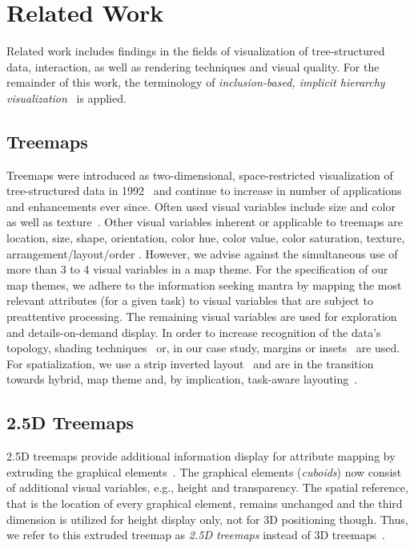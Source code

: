 \documentclass[sigconf]{acmart}
\begin{document}
\section{Related Work}
\label{sec:related}
\noindent Related work includes findings in the fields of visualization of tree-structured data, interaction, as well as rendering techniques and visual quality. 
For the remainder of this work, the terminology of \emph{inclusion-based, implicit hierarchy visualization}~\cite{Schulz2011,Dubel2014} is applied.

\subsection{Treemaps} 
Treemaps were introduced as two-dimensional, space-restricted visualization of tree-structured data in 1992~\cite{Shneiderman1992} and continue to increase in number of applications and enhancements ever since. 
Often used visual variables include size and color~\cite{Fekete2002} as well as texture~\cite{Holten2005}.
Other visual variables inherent or applicable to treemaps are location, size, shape, orientation, color hue, color value, color saturation, texture, arrangement/layout/order \cite{Roth2016}.
However, we advise against the simultaneous use of more than 3 to 4 visual variables in a map theme.
For the specification of our map themes, we adhere to the information seeking mantra by mapping the most relevant attributes (for a given task) to visual variables that are subject to preattentive processing. 
The remaining visual variables are used for exploration and details-on-demand display.
In order to increase recognition of the data's topology, shading techniques~\cite{VanWijk1999} or, in our case study, margins or insets~\cite{Shneiderman1992,Lue2008} are used.
For spatialization, we use a strip inverted layout~\cite{Tu2007} and are in the transition towards hybrid, map theme and, by implication, task-aware layouting~\cite{Hahn2017hybrid}.

\subsection{2.5D Treemaps}
2.5D treemaps provide additional information display for attribute mapping by extruding the graphical elements~\cite{Bladh2004}.
The graphical elements (\emph{cuboids}) now consist of additional visual variables, e.g., height and transparency.
The spatial reference, that is the location of every graphical element, remains unchanged and the third dimension is utilized for height display only, not for 3D positioning though.
Thus, we refer to this extruded treemap as \emph{2.5D treemaps} instead of 3D treemaps~\cite{Ham2002}.
\end{document}
